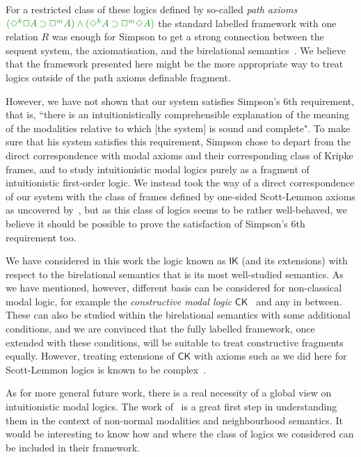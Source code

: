 \documentclass[a4paper]{article}
\theoremstyle{plain}
\theoremstyle{definition}
\newcommand*{\IK}{\mathsf{IK}}
\newcommand*{\AND}{\mathbin{\wedge}}
\newcommand*{\IMP}{\mathbin{\supset}}%
\newcommand*{\BOX}{\mathord{\Box}}
\newcommand*{\DIA}{\mathord{\Diamond}}
\newcommand*{\fm}[1]{{\color{notgreen}{#1}}}
\begin{document}
For a restricted class of these logics defined by so-called \emph{path axioms} $\fm{(\DIA^k\BOX A \IMP\BOX^m A) \AND (\DIA^k A \IMP \BOX^m\DIA A)}$ the standard labelled framework with one relation $R$ was enough for Simpson to get a strong connection between the sequent system, the axiomatisation, and the birelational semantics~\cite{simpson:phd}.
%
%
We believe that the framework presented here might be the more appropriate way to treat logics outside of the path axioms definable fragment.

However, we have not shown that our system satisfies Simpson's 6th requirement, that is, ``there is an intuitionistically comprehensible explanation of the meaning of the modalities relative to which [the system] is sound and complete".
%
To make sure that his system satisfies this requirement, Simpson chose to depart from the direct correspondence with modal axioms and their corresponding class of Kripke frames, and to study intuitionistic modal logics purely as a fragment of intuitionistic first-order logic.
%
We instead took the way of a direct correspondence of our system with the class of frames defined by one-sided Scott-Lemmon axioms as uncovered by~\cite{plotkin:stirling:86}, but as this class of logics seems to be rather well-behaved, we believe it should be possible to prove the satisfaction of Simpson's 6th requirement too.

We have considered in this work the logic known as $\IK$ (and its extensions) with respect to the birelational semantics that is its most well-studied semantics.
%
As we have mentioned, however, different basis can be considered for non-classical modal logic, for example the \emph{constructive modal logic} $\mathsf{CK}$~\cite{bierman:depaiva:sl00,mendler:scheele:ic11} and any in between.
%
These can also be studied within the birelational semantics with some additional conditions, and we are convinced that the fully labelled framework, once extended with these conditions, will be suitable to treat constructive fragments equally.
%
However, treating extensions of $\mathsf{CK}$ with axioms such as we did here for Scott-Lemmon logics is known to be complex~\cite{arisaka:etal:lmcs15}.

As for more general future work, there is a real necessity of a global view on intuitionistic modal logics.
%
The work of~\cite{dalmonte:grellois:olivetti:JPL2020} is a great first step in understanding them in the context of non-normal modalities and neighbourhood semantics.
%
It would be interesting to know how and where the class of logics we considered can be included in their framework.



 
 
 
\end{document}
